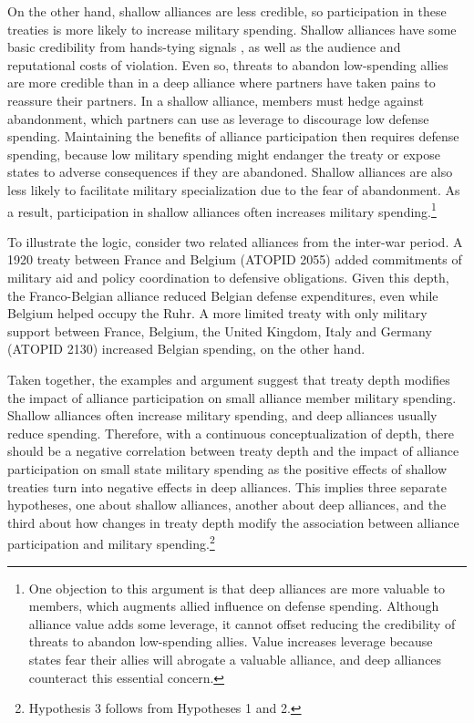 \documentclass[12pt]{article}
\begin{document}
On the other hand, shallow alliances are less credible, so participation in these treaties is more likely to increase military spending. 
Shallow alliances have some basic credibility from hands-tying signals \citep{Fearon1997}, as well as the audience \citep{Morrow2000} and reputational \citep{Gibler2008, Crescenzietal2012} costs of violation.
Even so, threats to abandon low-spending allies are more credible than in a deep alliance where partners have taken pains to reassure their partners.  
In a shallow alliance, members must hedge against abandonment, which partners can use as leverage to discourage low defense spending. 
Maintaining the benefits of alliance participation then requires defense spending, because low military spending might endanger the treaty or expose states to adverse consequences if they are abandoned. 
Shallow alliances are also less likely to facilitate military specialization due to the fear of abandonment. 
As a result, participation in shallow alliances often increases military spending.\footnote{
One objection to this argument is that deep alliances are more valuable to members, which augments allied influence on defense spending. 
Although alliance value adds some leverage, it cannot offset reducing the credibility of threats to abandon low-spending allies.
Value increases leverage because states fear their allies will abrogate a valuable alliance, and deep alliances counteract this essential concern. 
}


To illustrate the logic, consider two related alliances from the inter-war period. 
A 1920 treaty between France and Belgium (ATOPID 2055) added commitments of military aid and policy coordination to defensive obligations. 
Given this depth, the Franco-Belgian alliance reduced Belgian defense expenditures, even while Belgium helped occupy the Ruhr. 
A more limited treaty with only military support between France, Belgium, the United Kingdom, Italy and Germany (ATOPID 2130) increased Belgian spending, on the other hand.   
 
 
Taken together, the examples and argument suggest that treaty depth modifies the impact of alliance participation on small alliance member military spending. 
Shallow alliances often increase military spending, and deep alliances usually reduce spending.  
Therefore, with a continuous conceptualization of depth, there should be a negative correlation between treaty depth and the impact of alliance participation on small state military spending as the positive effects of shallow treaties turn into negative effects in deep alliances. 
This implies three separate hypotheses, one about shallow alliances, another about deep alliances, and the third about how changes in treaty depth modify the association between alliance participation and military spending.\footnote{Hypothesis 3 follows from Hypotheses 1 and 2.}
 
\end{document}
